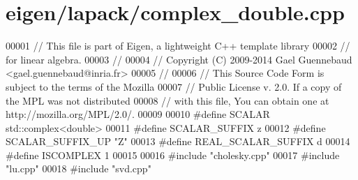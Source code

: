 \hypertarget{eigen_2lapack_2complex__double_8cpp_source}{}\section{eigen/lapack/complex\+\_\+double.cpp}
\label{eigen_2lapack_2complex__double_8cpp_source}

\begin{DoxyCode}
00001 \textcolor{comment}{// This file is part of Eigen, a lightweight C++ template library}
00002 \textcolor{comment}{// for linear algebra.}
00003 \textcolor{comment}{//}
00004 \textcolor{comment}{// Copyright (C) 2009-2014 Gael Guennebaud <gael.guennebaud@inria.fr>}
00005 \textcolor{comment}{//}
00006 \textcolor{comment}{// This Source Code Form is subject to the terms of the Mozilla}
00007 \textcolor{comment}{// Public License v. 2.0. If a copy of the MPL was not distributed}
00008 \textcolor{comment}{// with this file, You can obtain one at http://mozilla.org/MPL/2.0/.}
00009 
00010 \textcolor{preprocessor}{#define SCALAR        std::complex<double>}
00011 \textcolor{preprocessor}{#define SCALAR\_SUFFIX z}
00012 \textcolor{preprocessor}{#define SCALAR\_SUFFIX\_UP "Z"}
00013 \textcolor{preprocessor}{#define REAL\_SCALAR\_SUFFIX d}
00014 \textcolor{preprocessor}{#define ISCOMPLEX     1}
00015 
00016 \textcolor{preprocessor}{#include "cholesky.cpp"}
00017 \textcolor{preprocessor}{#include "lu.cpp"}
00018 \textcolor{preprocessor}{#include "svd.cpp"}
\end{DoxyCode}
